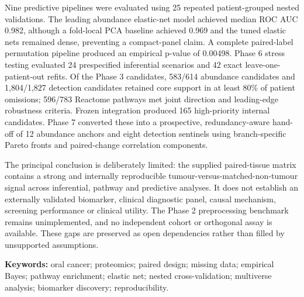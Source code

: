 Nine predictive pipelines were evaluated using 25 repeated patient-grouped nested validations. The leading abundance elastic-net model achieved median ROC AUC 0.982, although a fold-local PCA baseline achieved 0.969 and the tuned elastic nets remained dense, preventing a compact-panel claim. A complete paired-label permutation pipeline produced an empirical p-value of 0.00498. Phase 6 stress testing evaluated 24 prespecified inferential scenarios and 42 exact leave-one-patient-out refits. Of the Phase 3 candidates, 583/614 abundance candidates and 1,804/1,827 detection candidates retained core support in at least 80\% of patient omissions; 596/783 Reactome pathways met joint direction and leading-edge robustness criteria. Frozen integration produced 165 high-priority internal candidates. Phase 7 converted these into a prospective, redundancy-aware hand-off of 12 abundance anchors and eight detection sentinels using branch-specific Pareto fronts and paired-change correlation components.

The principal conclusion is deliberately limited: the supplied paired-tissue matrix contains a strong and internally reproducible tumour-versus-matched-non-tumour signal across inferential, pathway and predictive analyses. It does not establish an externally validated biomarker, clinical diagnostic panel, causal mechanism, screening performance or clinical utility. The Phase 2 preprocessing benchmark remains unimplemented, and no independent cohort or orthogonal assay is available. These gaps are preserved as open dependencies rather than filled by unsupported assumptions.

\textbf{Keywords:} oral cancer; proteomics; paired design; missing data; empirical Bayes; pathway enrichment; elastic net; nested cross-validation; multiverse analysis; biomarker discovery; reproducibility.
